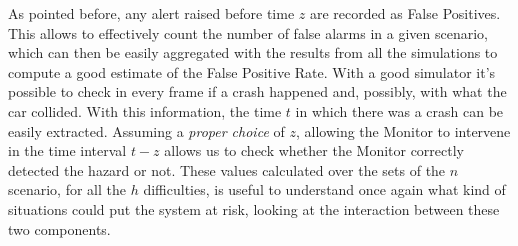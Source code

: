 As pointed before, any alert raised before time $z$ are recorded as False Positives. This allows to effectively count the number of false alarms in a given scenario, which can then be easily aggregated with the results from all the simulations to compute a good estimate of the False Positive Rate.\newline
With a good simulator it's possible to check in every frame if a crash happened and, possibly, with what the car collided. With this information, the time $t$ in which there was a crash can be easily extracted. Assuming a \textsl{proper choice} of $z$, allowing the Monitor to intervene in the time interval $t-z$ allows us to check whether the Monitor correctly detected the hazard or not.\newline
These values calculated over the sets of the $n$ scenario, for all the $h$ difficulties, is useful to understand once again what kind of situations could put the system at risk, looking at the interaction between these two components.